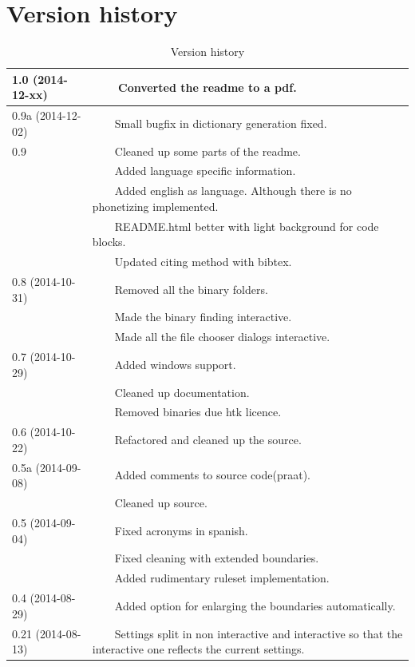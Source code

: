 \documentclass[twoside,a4paper]{book}
\newcommand{\tabitem}{~~\llap{\textbullet}~~}
\begin{document}
\section{Version history}
\begin{table}[H]
	\centering
	\caption{Version history}
	\begin{tabular}{|p{0.2\linewidth}p{0.8\linewidth}|}
		\hline
		1.0 (2014-12-xx) & \tabitem Converted the readme to a pdf.\\
		\hline
		0.9a (2014-12-02) & \tabitem Small bugfix in dictionary generation fixed.\\
		\hline
		0.9 & \tabitem Cleaned up some parts of the readme.\\
			& \tabitem Added language specific information.\\
			& \tabitem Added english as language. Although there is no phonetizing
implemented.\\
			& \tabitem README.html better with light background for code blocks.\\
			& \tabitem Updated citing method with bibtex.\\
		\hline
		0.8 (2014-10-31) & \tabitem Removed all the binary folders.\\
			& \tabitem Made the binary finding interactive.\\
			& \tabitem Made all the file chooser dialogs interactive.\\
		\hline
		0.7 (2014-10-29) & \tabitem Added windows support.\\
			&	\tabitem Cleaned up documentation.\\
			& \tabitem Removed binaries due htk licence.\\
		\hline
		0.6 (2014-10-22) & \tabitem Refactored and cleaned up the source.\\
		\hline
		0.5a (2014-09-08) & \tabitem Added comments to source code(praat).\\
			& \tabitem Cleaned up source.\\
		\hline
		0.5 (2014-09-04) & \tabitem Fixed acronyms in spanish.\\
			& \tabitem Fixed cleaning with extended boundaries.\\
			& \tabitem Added rudimentary ruleset implementation.\\
		\hline
		0.4 (2014-08-29) & \tabitem Added option for enlarging the boundaries
automatically.\\
		\hline
		0.21 (2014-08-13) & \tabitem Settings split in non interactive and
interactive so that the interactive one reflects the current settings.\\

\end{tabular}
\end{table}
\end{document}
